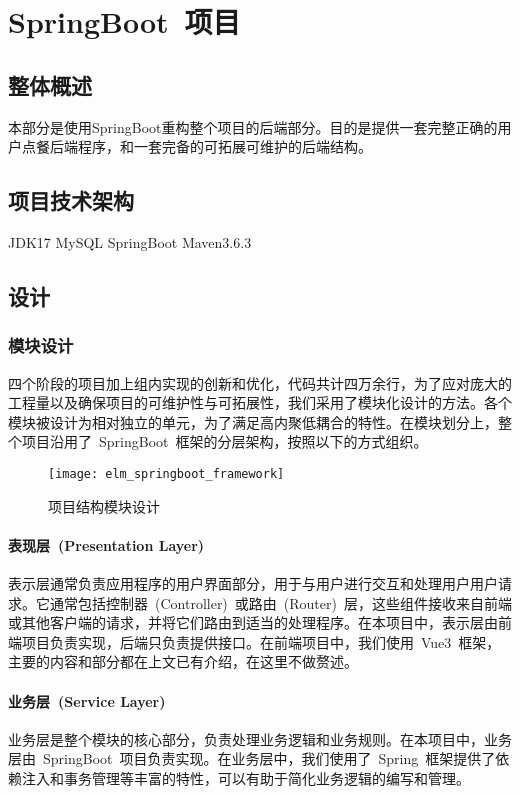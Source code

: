 \chapter{SpringBoot~项目}
\section{整体概述}
本部分是使用SpringBoot重构整个项目的后端部分。目的是提供一套完整正确的用户点餐后端程序，和一套完备的可拓展可维护的后端结构。

\section{项目技术架构}
JDK17 MySQL SpringBoot Maven3.6.3

\section{设计}

\subsection{模块设计}
四个阶段的项目加上组内实现的创新和优化，代码共计四万余行，为了应对庞大的工程量以及确保项目的可维护性与可拓展性，我们采用了模块化设计的方法。各个模块被设计为相对独立的单元，为了满足高内聚低耦合的特性。在模块划分上，整个项目沿用了~SpringBoot~框架的分层架构，按照以下的方式组织。
\begin{figure}[htbp]
    \centering
    \texttt{[image: elm\_springboot\_framework]}
    \caption{项目结构模块设计}\label{fig:elm_springboot_framework}
    \vspace{\baselineskip}
\end{figure}

\subsubsection{表现层~(Presentation Layer)~}
表示层通常负责应用程序的用户界面部分，用于与用户进行交互和处理用户用户请求。它通常包括控制器~(Controller)~或路由~(Router)~层，这些组件接收来自前端或其他客户端的请求，并将它们路由到适当的处理程序。在本项目中，表示层由前端项目负责实现，后端只负责提供接口。在前端项目中，我们使用~Vue3~框架，主要的内容和部分都在上文已有介绍，在这里不做赘述。

\subsubsection{业务层~(Service Layer)~}
业务层是整个模块的核心部分，负责处理业务逻辑和业务规则。在本项目中，业务层由~SpringBoot~项目负责实现。在业务层中，我们使用了~Spring~框架提供了依赖注入和事务管理等丰富的特性，可以有助于简化业务逻辑的编写和管理。

